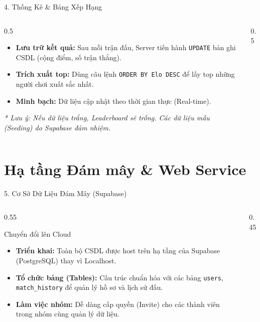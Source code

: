 \begin{frame}{4. Thống Kê & Bảng Xếp Hạng}
\begin{columns}
\begin{column}{0.5\textwidth}
\begin{itemize}
\item \textbf{Lưu trữ kết quả:} Sau mỗi trận đấu, Server tiến hành \texttt{UPDATE} bản ghi CSDL (cộng điểm, số trận thắng).
\item \textbf{Trích xuất top:} Dùng câu lệnh \texttt{ORDER BY Elo DESC} để lấy top những người chơi xuất sắc nhất.
\item \textbf{Minh bạch:} Dữ liệu cập nhật theo thời gian thực (Real-time).
\end{itemize}
\vspace{0.3cm}
\textit{* Lưu ý: Nếu dữ liệu trắng, Leaderboard sẽ trống. Các dữ liệu mẫu (Seeding) do Supabase đảm nhiệm.}
\end{column}
\begin{column}{0.5\textwidth}
\centering
{}
\end{column}
\end{columns}
\end{frame}


\section{Hạ tầng Đám mây & Web Service}

\begin{frame}{5. Cơ Sở Dữ Liệu Đám Mây (Supabase)}
\begin{columns}
\begin{column}{0.55\textwidth}
\begin{block}{Chuyển đổi lên Cloud}
\begin{itemize}
\item \textbf{Triển khai:} Toàn bộ CSDL được host trên hạ tầng của Supabase (PostgreSQL) thay vì Localhost.
\item \textbf{Tổ chức bảng (Tables):} Cấu trúc chuẩn hóa với các bảng \texttt{users}, \texttt{match_history} để quản lý hồ sơ và lịch sử đấu.
\item \textbf{Làm việc nhóm:} Dễ dàng cấp quyền (Invite) cho các thành viên trong nhóm cùng quản lý dữ liệu.
\end{itemize}
\end{block}
\end{column}
\begin{column}{0.45\textwidth}
\centering
{}
\end{column}
\end{columns}
\end{frame}

